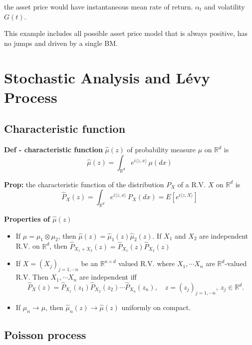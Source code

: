 \documentclass[
  letterpaper,
  DIV=11,
  numbers=noendperiod]{scrreprt}
\providecommand{\tightlist}{%
  \setlength{\itemsep}{0pt}\setlength{\parskip}{0pt}}
\theoremstyle{definition}
\theoremstyle{plain}
\theoremstyle{plain}
\theoremstyle{definition}
\theoremstyle{plain}
\theoremstyle{plain}
\theoremstyle{remark}
\begin{document}
the asset price would have instantaneous mean rate of return.
\(\alpha_t\) and volatility \(G(t)\).

This example includes all possible asset price model that is always
positive, has no jumps and driven by a single BM.

\chapter{Stochastic Analysis and Lévy
Process}\label{stochastic-analysis-and-luxe9vy-process}

\section{Characteristic function}\label{characteristic-function}

\textbf{Def - characteristic function} \(\hat{\mu}(z)\) of probability
measure \(\mu\) on \(\mathbb{R}^d\) is \[
\hat{\mu}(z) = \int_{\mathbb{R}^d} e^{i\langle z, x\rangle} \, \mu(dx)
\]

\textbf{Prop:} the characteristic function of the distribution \(P_X\)
of a R.V. \(X\) on \(\mathbb{R}^d\) is \[
\hat{P}_X(z) = \int_{\mathbb{R}^d} e^{i\langle z, x\rangle} \, P_X(dx) = E[e^{i\langle z, X\rangle}]
\]

\textbf{Properties of \(\hat{\mu}(z)\)}

\begin{itemize}
\tightlist
\item
  If \(\mu = \mu_1 \otimes \mu_2\), then
  \(\hat{\mu}(z) = \hat{\mu}_1(z)\hat{\mu}_2(z)\). If \(X_1\) and
  \(X_2\) are independent R.V. on \(\mathbb{R}^d\), then
  \(\hat{P}_{X_1 + X_2}(z) = \hat{P}_{X_1}(z)\hat{P}_{X_2}(z)\)
\item
  If \(X = (X_j)_{j=1,\cdots n}\) be an \(\mathbb{R}^{n \times d}\)
  valued R.V. where \(X_1, \cdots X_n\) are \(\mathbb{R}^d\)-valued R.V.
  Then \(X_1, \cdots X_n\) are independent iff \[
  \hat{P}_X(z) = \hat{P}_{X_1}(z_1)\hat{P}_{X_2}(z_2) \cdots \hat{P}_{X_n}(z_n), \quad z = (z_j)_{j=1,\cdots n}, \ z_j \in \mathbb{R}^d.
  \]
\item
  If \(\mu_n \to \mu\), then \(\hat{\mu}_n(z) \to \hat{\mu}(z)\)
  uniformly on compact.
\end{itemize}

\section{Poisson process}\label{poisson-process}
\end{document}
